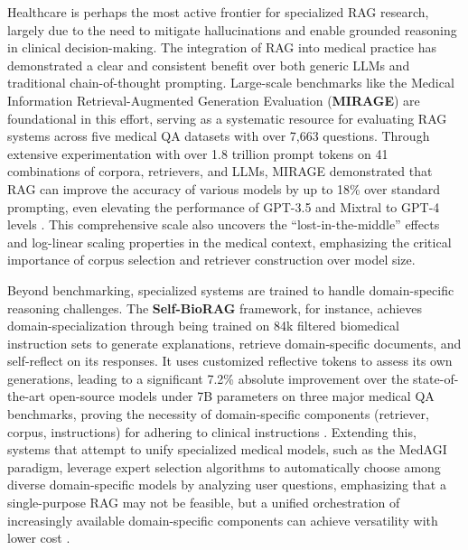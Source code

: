 \documentclass[11pt]{article}
\begin{document}
Healthcare is perhaps the most active frontier for specialized RAG research, largely due to the need to mitigate hallucinations and enable grounded reasoning in clinical decision-making. The integration of RAG into medical practice has demonstrated a clear and consistent benefit over both generic LLMs and traditional chain-of-thought prompting. Large-scale benchmarks like the Medical Information Retrieval-Augmented Generation Evaluation (\textbf{MIRAGE}) are foundational in this effort, serving as a systematic resource for evaluating RAG systems across five medical QA datasets with over 7,663 questions. Through extensive experimentation with over 1.8 trillion prompt tokens on 41 combinations of corpora, retrievers, and LLMs, MIRAGE demonstrated that RAG can improve the accuracy of various models by up to 18\% over standard prompting, even elevating the performance of GPT-3.5 and Mixtral to GPT-4 levels \cite{ref27}. This comprehensive scale also uncovers the ``lost-in-the-middle'' effects and log-linear scaling properties in the medical context, emphasizing the critical importance of corpus selection and retriever construction over model size.

Beyond benchmarking, specialized systems are trained to handle domain-specific reasoning challenges. The \textbf{Self-BioRAG} framework, for instance, achieves domain-specialization through being trained on 84k filtered biomedical instruction sets to generate explanations, retrieve domain-specific documents, and self-reflect on its responses. It uses customized reflective tokens to assess its own generations, leading to a significant 7.2\% absolute improvement over the state-of-the-art open-source models under 7B parameters on three major medical QA benchmarks, proving the necessity of domain-specific components (retriever, corpus, instructions) for adhering to clinical instructions \cite{ref65}. Extending this, systems that attempt to unify specialized medical models, such as the MedAGI paradigm, leverage expert selection algorithms to automatically choose among diverse domain-specific models by analyzing user questions, emphasizing that a single-purpose RAG may not be feasible, but a unified orchestration of increasingly available domain-specific components can achieve versatility with lower cost \cite{ref382}.
\end{document}
